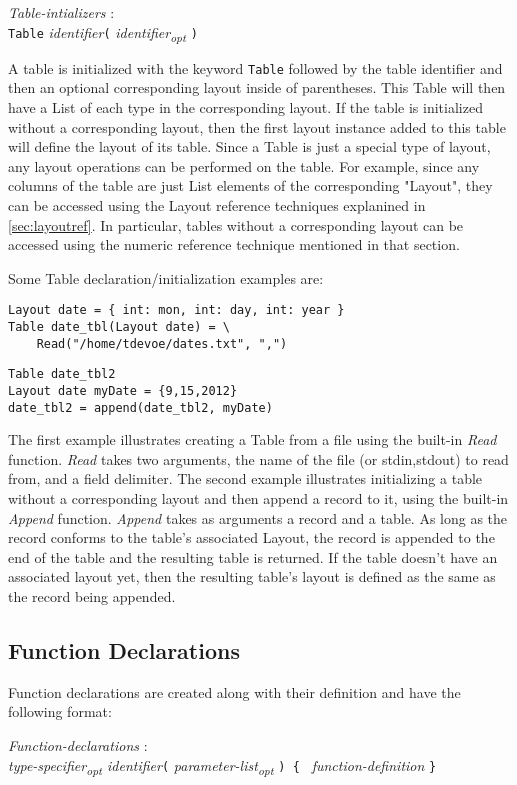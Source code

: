 \documentclass{article}
\begin{document}
\begin{tabbing}
	\= \emph{Table}\=\emph{-intializers} : \\
		\> \> \texttt{Table} \emph{identifier}\texttt{(} \emph{identifier\textsubscript{opt}} \texttt{)}
\end{tabbing}

A table is initialized with the keyword \texttt{Table} followed by the table identifier and then an optional corresponding layout inside of parentheses. This Table will then have a List of each type in the corresponding layout. If the table is initialized without a corresponding layout, then the first layout instance added to this table will define the layout of its table. Since a Table is just a special type of layout, any layout operations can be performed on the table. For example, since any columns of the table are just List elements of the corresponding "Layout", they can be accessed using the Layout reference techniques explanined in \ref{sec:layoutref}. In particular, tables without a corresponding layout can be accessed using the numeric reference technique mentioned in that section.

Some Table declaration/initialization examples are:

\begin{lstlisting}
Layout date = { int: mon, int: day, int: year }
Table date_tbl(Layout date) = \
	Read("/home/tdevoe/dates.txt", ",")
\end{lstlisting}
\begin{lstlisting}
Table date_tbl2
Layout date myDate = {9,15,2012}
date_tbl2 = append(date_tbl2, myDate)
\end{lstlisting}

The first example illustrates creating a Table from a file using the built-in \emph{Read} function. \emph{Read} takes two arguments, the name of the file (or stdin,stdout) to read from, and a field delimiter. The second example illustrates initializing a table without a corresponding layout and then append a record to it, using the built-in \emph{Append} function. \emph{Append} takes as arguments a record and a table. As long as the record conforms to the table's associated Layout, the record is appended to the end of the table and the resulting table is returned. If the table doesn't have an associated layout yet, then the resulting table's layout is defined as the same as the record being appended.

\subsection{Function Declarations}
\label{sec:funcdec}
Function declarations are created along with their definition and have the following format:
\begin{tabbing}
	\= \emph{Function}\=\emph{-declarations} : \\
		\> \> \emph{type-specifier\textsubscript{opt} identifier}\texttt{(} \emph{parameter-list\textsubscript{opt}} \texttt{) 
\{ } \emph{function-definition} \texttt{\}}
\end{tabbing}
\end{document}

